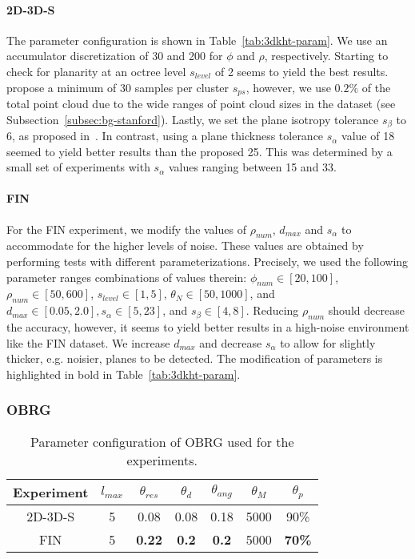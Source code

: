 \documentclass[main.tex]{subfiles}
\begin{document}
\paragraph{2D-3D-S}
The parameter configuration is shown in Table~\ref{tab:3dkht-param}. We use an accumulator discretization of 30 and 200 for $\phi$ and $\rho$, respectively.
Starting to check for planarity at an octree level $s_{level}$ of 2 seems to yield the best results.
\citeauthor{LimbergerOliveira2015HT3D}\cite{LimbergerOliveira2015HT3D} propose
a minimum of 30 samples per cluster $s_{ps}$, however, we use $0.2\%$ of the total point cloud due to the wide ranges of point cloud sizes in the dataset (see Subsection~\ref{subsec:bg-stanford}).
Lastly, we set the plane isotropy tolerance $s_\beta$ to 6, as proposed in~\cite[Section~3.1]{LimbergerOliveira2015HT3D}.
In contrast, using a plane thickness tolerance $s_\alpha$ value of 18 seemed to yield better results than the proposed 25.
This was determined by a small set of experiments with $s_\alpha$ values ranging between 15 and 33.

\paragraph{FIN}
For the FIN experiment, we modify the values of $\rho_{num}$, $d_{max}$ and $s_\alpha$ to accommodate for the higher levels of noise.
These values are obtained by performing tests with different parameterizations. Precisely, we used the following parameter ranges
combinations of values therein:
$\phi_{num} \in [20, 100]$, $\rho_{num} \in [50, 600]$, $s_{level}\in[1, 5]$, $\theta_N \in [50, 1000]$, and $d_{max} \in [0.05, 2.0], s_\alpha \in [5, 23]$, and $s_\beta \in [4, 8]$.
Reducing $\rho_{num}$ should decrease the accuracy, however, it seems to yield better results in a high-noise environment like the FIN dataset.
We increase $d_{max}$ and decrease $s_\alpha$ to allow for slightly thicker, e.g. noisier, planes to be detected.
The modification of parameters is highlighted in bold in Table~\ref{tab:3dkht-param}.


\subsubsection{OBRG}
\begin{table}[H]
    \centering
    \begin{tabular}{c|cccccc}
        Experiment & $l_{max}$ & $\theta_{res}$ & $\theta_{d}$ & $\theta_{ang}$ & $\theta_M$ & $\theta_p$    \\ \hline
        2D-3D-S    & 5         & 0.08           & 0.08         & 0.18           & 5000       & 90\%          \\
        FIN        & 5         & \textbf{0.22}  & \textbf{0.2} & \textbf{0.2}   & 5000       & \textbf{70\%}
    \end{tabular}
    \caption{Parameter configuration of OBRG used for the experiments.}
    \label{tab:obrg-param}
\end{table}
\end{document}
